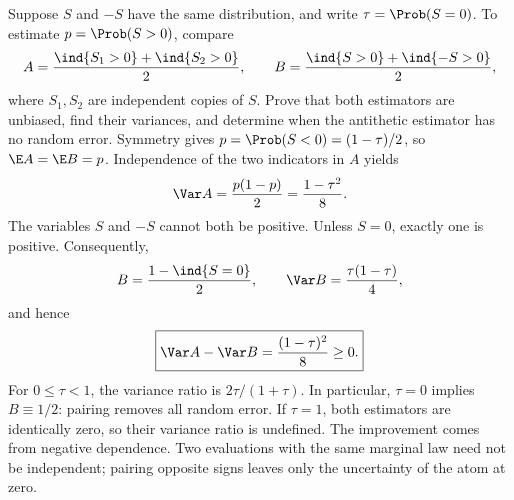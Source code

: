 Suppose $S$ and $-S$ have the same distribution, and write $\tau=\Prob(S=0)$. To estimate $p=\Prob(S>0)$, compare
\[
A=\frac{\ind\{S_1>0\}+\ind\{S_2>0\}}2,
\qquad B=\frac{\ind\{S>0\}+\ind\{-S>0\}}2,
\]
where $S_1,S_2$ are independent copies of $S$. Prove that both estimators are unbiased, find their variances, and determine when the antithetic estimator has no random error.
\solution Symmetry gives $p=\Prob(S<0)=(1-\tau)/2$, so $\E A=\E B=p$. Independence of the two indicators in $A$ yields
\[
\Var A=\frac{p(1-p)}2=\frac{1-\tau^2}{8}.
\]
The variables $S$ and $-S$ cannot both be positive. Unless $S=0$, exactly one is positive. Consequently,
\[
B=\frac{1-\ind\{S=0\}}2,
\qquad \Var B=\frac{\tau(1-\tau)}4,
\]
and hence
\[
\boxed{\Var A-\Var B=\frac{(1-\tau)^2}{8}\ge0.}
\]
For $0\le\tau<1$, the variance ratio is $2\tau/(1+\tau)$. In particular, $\tau=0$ implies $B\equiv1/2$: pairing removes all random error. If $\tau=1$, both estimators are identically zero, so their variance ratio is undefined.
\insight The improvement comes from negative dependence. Two evaluations with the same marginal law need not be independent; pairing opposite signs leaves only the uncertainty of the atom at zero.
